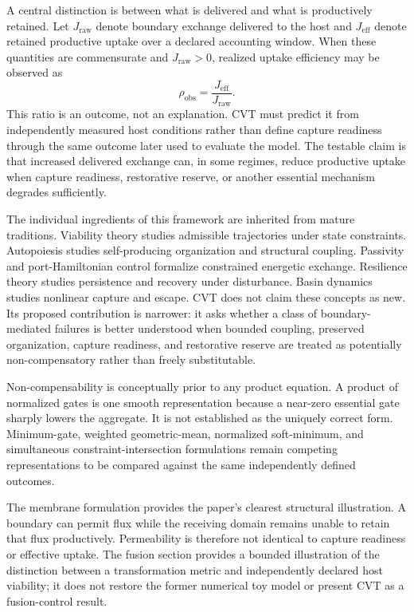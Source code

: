 \documentclass[11pt]{article}
\begin{document}
A central distinction is between what is delivered and what is productively retained. Let \(J_{\mathrm{raw}}\) denote boundary exchange delivered to the host and \(J_{\mathrm{eff}}\) denote retained productive uptake over a declared accounting window. When these quantities are commensurate and \(J_{\mathrm{raw}}>0\), realized uptake efficiency may be observed as
\begin{equation}
    \rho_{\mathrm{obs}}
    =
    \frac{J_{\mathrm{eff}}}{J_{\mathrm{raw}}}.
\end{equation}
This ratio is an outcome, not an explanation. CVT must predict it from independently measured host conditions rather than define capture readiness through the same outcome later used to evaluate the model. The testable claim is that increased delivered exchange can, in some regimes, reduce productive uptake when capture readiness, restorative reserve, or another essential mechanism degrades sufficiently.

The individual ingredients of this framework are inherited from mature traditions. Viability theory studies admissible trajectories under state constraints. Autopoiesis studies self-producing organization and structural coupling. Passivity and port-Hamiltonian control formalize constrained energetic exchange. Resilience theory studies persistence and recovery under disturbance. Basin dynamics studies nonlinear capture and escape. CVT does not claim these concepts as new. Its proposed contribution is narrower: it asks whether a class of boundary-mediated failures is better understood when bounded coupling, preserved organization, capture readiness, and restorative reserve are treated as potentially non-compensatory rather than freely substitutable.

Non-compensability is conceptually prior to any product equation. A product of normalized gates is one smooth representation because a near-zero essential gate sharply lowers the aggregate. It is not established as the uniquely correct form. Minimum-gate, weighted geometric-mean, normalized soft-minimum, and simultaneous constraint-intersection formulations remain competing representations to be compared against the same independently defined outcomes.

The membrane formulation provides the paper's clearest structural illustration. A boundary can permit flux while the receiving domain remains unable to retain that flux productively. Permeability is therefore not identical to capture readiness or effective uptake. The fusion section provides a bounded illustration of the distinction between a transformation metric and independently declared host viability; it does not restore the former numerical toy model or present CVT as a fusion-control result.
\end{document}
